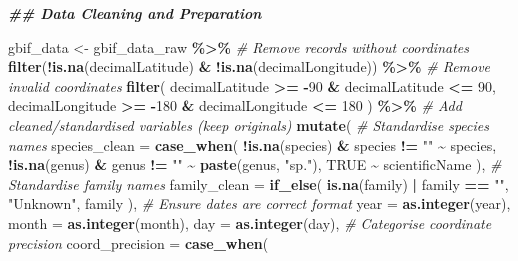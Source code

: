 \documentclass[
]{article}
\newenvironment{Shaded}{\begin{snugshade}}{\end{snugshade}}
\newcommand{\AttributeTok}[1]{\textcolor[rgb]{0.13,0.29,0.53}{#1}}
\newcommand{\CommentTok}[1]{\textcolor[rgb]{0.56,0.35,0.01}{\textit{#1}}}
\newcommand{\ConstantTok}[1]{\textcolor[rgb]{0.56,0.35,0.01}{#1}}
\newcommand{\DecValTok}[1]{\textcolor[rgb]{0.00,0.00,0.81}{#1}}
\newcommand{\DocumentationTok}[1]{\textcolor[rgb]{0.56,0.35,0.01}{\textbf{\textit{#1}}}}
\newcommand{\FunctionTok}[1]{\textcolor[rgb]{0.13,0.29,0.53}{\textbf{#1}}}
\newcommand{\NormalTok}[1]{#1}
\newcommand{\OtherTok}[1]{\textcolor[rgb]{0.56,0.35,0.01}{#1}}
\newcommand{\SpecialCharTok}[1]{\textcolor[rgb]{0.81,0.36,0.00}{\textbf{#1}}}
\newcommand{\StringTok}[1]{\textcolor[rgb]{0.31,0.60,0.02}{#1}}
\begin{document}
\begin{Shaded}
\begin{Highlighting}[]
\DocumentationTok{\#\# Data Cleaning and Preparation}

\NormalTok{gbif\_data }\OtherTok{\textless{}{-}}\NormalTok{ gbif\_data\_raw }\SpecialCharTok{\%\textgreater{}\%}
  \CommentTok{\# Remove records without coordinates}
  \FunctionTok{filter}\NormalTok{(}\SpecialCharTok{!}\FunctionTok{is.na}\NormalTok{(decimalLatitude) }\SpecialCharTok{\&} \SpecialCharTok{!}\FunctionTok{is.na}\NormalTok{(decimalLongitude)) }\SpecialCharTok{\%\textgreater{}\%}
  \CommentTok{\# Remove invalid coordinates}
  \FunctionTok{filter}\NormalTok{(}
\NormalTok{    decimalLatitude }\SpecialCharTok{\textgreater{}=} \SpecialCharTok{{-}}\DecValTok{90} \SpecialCharTok{\&}\NormalTok{ decimalLatitude }\SpecialCharTok{\textless{}=} \DecValTok{90}\NormalTok{,}
\NormalTok{    decimalLongitude }\SpecialCharTok{\textgreater{}=} \SpecialCharTok{{-}}\DecValTok{180} \SpecialCharTok{\&}\NormalTok{ decimalLongitude }\SpecialCharTok{\textless{}=} \DecValTok{180}
\NormalTok{  ) }\SpecialCharTok{\%\textgreater{}\%}
  \CommentTok{\# Add cleaned/standardised variables (keep originals)}
  \FunctionTok{mutate}\NormalTok{(}
    \CommentTok{\# Standardise species names}
    \AttributeTok{species\_clean =} \FunctionTok{case\_when}\NormalTok{(}
      \SpecialCharTok{!}\FunctionTok{is.na}\NormalTok{(species) }\SpecialCharTok{\&}\NormalTok{ species }\SpecialCharTok{!=} \StringTok{""} \SpecialCharTok{\textasciitilde{}}\NormalTok{ species,}
      \SpecialCharTok{!}\FunctionTok{is.na}\NormalTok{(genus) }\SpecialCharTok{\&}\NormalTok{ genus }\SpecialCharTok{!=} \StringTok{""} \SpecialCharTok{\textasciitilde{}} \FunctionTok{paste}\NormalTok{(genus, }\StringTok{"sp."}\NormalTok{),}
      \ConstantTok{TRUE} \SpecialCharTok{\textasciitilde{}}\NormalTok{ scientificName}
\NormalTok{    ),}
    \CommentTok{\# Standardise family names}
    \AttributeTok{family\_clean =} \FunctionTok{if\_else}\NormalTok{(}
      \FunctionTok{is.na}\NormalTok{(family) }\SpecialCharTok{|}\NormalTok{ family }\SpecialCharTok{==} \StringTok{""}\NormalTok{,}
      \StringTok{"Unknown"}\NormalTok{,}
\NormalTok{      family}
\NormalTok{    ),}
    \CommentTok{\# Ensure dates are correct format}
    \AttributeTok{year =} \FunctionTok{as.integer}\NormalTok{(year),}
    \AttributeTok{month =} \FunctionTok{as.integer}\NormalTok{(month),}
    \AttributeTok{day =} \FunctionTok{as.integer}\NormalTok{(day),}
    \CommentTok{\# Categorise coordinate precision}
    \AttributeTok{coord\_precision =} \FunctionTok{case\_when}\NormalTok{(}

\end{Highlighting}
\end{Shaded}
\end{document}
